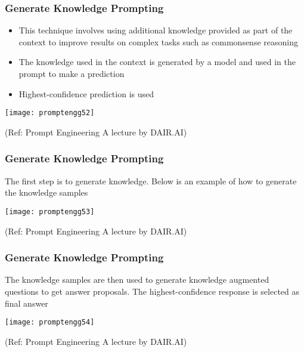 \begin{frame}[fragile]\frametitle{Generate Knowledge Prompting}

\begin{itemize}
\item This technique involves using additional knowledge 
provided as part of the context to improve results on 
complex tasks such as commonsense reasoning 
\item The knowledge used in the context is generated by a 
model and used in the prompt to make a prediction 
\item Highest-confidence prediction is used
\end{itemize}	

\begin{center}
\texttt{[image: promptengg52]}

{\tiny (Ref: Prompt Engineering A lecture by DAIR.AI)}

\end{center}	

\end{frame}

\begin{frame}[fragile]\frametitle{Generate Knowledge Prompting}

The first step is to generate knowledge. Below is an 
example of how to generate the knowledge samples

\begin{center}
\texttt{[image: promptengg53]}

{\tiny (Ref: Prompt Engineering A lecture by DAIR.AI)}

\end{center}	

\end{frame}

\begin{frame}[fragile]\frametitle{Generate Knowledge Prompting}

The knowledge samples are then used to generate 
knowledge augmented questions to get answer proposals. The highest-confidence response is selected as final answer

\begin{center}
\texttt{[image: promptengg54]}

{\tiny (Ref: Prompt Engineering A lecture by DAIR.AI)}

\end{center}	

\end{frame}


